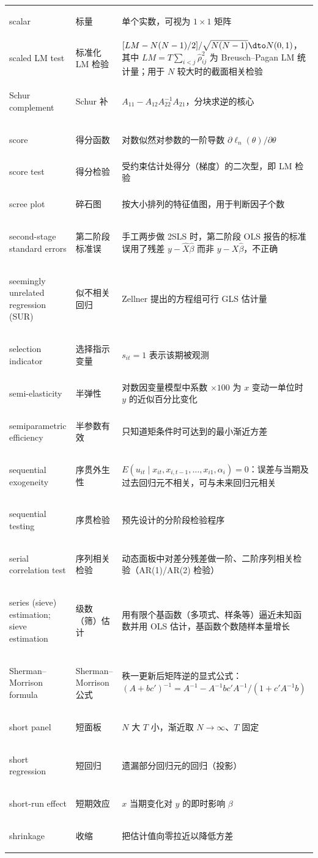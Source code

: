 \begin{longtable}{@{}>{\bfseries\boldmath\raggedright\arraybackslash}p{4.6cm}>{\raggedright\arraybackslash}p{3.2cm}>{\raggedright\arraybackslash}p{\dimexpr\textwidth-7.8cm-4\tabcolsep\relax}@{}}
scalar & 标量 & 单个实数，可视为 $1\times1$ 矩阵 \\
scaled LM test & 标准化 LM 检验 & $[LM-N(N-1)/2]/\sqrt{N(N-1)}\dto N(0,1)$，其中 $LM=T\sum_{i<j}\hat\rho_{ij}^2$ 为 Breusch--Pagan LM 统计量；用于 $N$ 较大时的截面相关检验 \\
Schur complement & Schur 补 & $A_{11}-A_{12}A_{22}^{-1}A_{21}$，分块求逆的核心 \\
score & 得分函数 & 对数似然对参数的一阶导数 $\partial\ell_n(\theta)/\partial\theta$ \\
score test & 得分检验 & 受约束估计处得分（梯度）的二次型，即 LM 检验 \\
scree plot & 碎石图 & 按大小排列的特征值图，用于判断因子个数 \\
second-stage standard errors & 第二阶段标准误 & 手工两步做 2SLS 时，第二阶段 OLS 报告的标准误用了残差 $y-\hat X\hat\beta$ 而非 $y-X\hat\beta$，不正确 \\
seemingly unrelated regression (SUR) & 似不相关回归 & Zellner 提出的方程组可行 GLS 估计量 \\
selection indicator & 选择指示变量 & $s_{it}=1$ 表示该期被观测 \\
semi-elasticity & 半弹性 & 对数因变量模型中系数 $\times100$ 为 $x$ 变动一单位时 $y$ 的近似百分比变化 \\
semiparametric efficiency & 半参数有效 & 只知道矩条件时可达到的最小渐近方差 \\
sequential exogeneity & 序贯外生性 & $E(u_{it}\mid x_{it},x_{i,t-1},\dots,x_{i1},\alpha_i)=0$：误差与当期及过去回归元不相关，可与未来回归元相关 \\
sequential testing & 序贯检验 & 预先设计的分阶段检验程序 \\
serial correlation test & 序列相关检验 & 动态面板中对差分残差做一阶、二阶序列相关检验（AR(1)/AR(2) 检验） \\
series (sieve) estimation; sieve estimation & 级数（筛）估计 & 用有限个基函数（多项式、样条等）逼近未知函数并用 OLS 估计，基函数个数随样本量增长 \\
Sherman--Morrison formula & Sherman--Morrison 公式 & 秩一更新后矩阵逆的显式公式：$(A+bc')^{-1}=A^{-1}-A^{-1}bc'A^{-1}/(1+c'A^{-1}b)$ \\
short panel & 短面板 & $N$ 大 $T$ 小，渐近取 $N\to\infty$、$T$ 固定 \\
short regression & 短回归 & 遗漏部分回归元的回归（投影） \\
short-run effect & 短期效应 & $x$ 当期变化对 $y$ 的即时影响 $\beta$ \\
shrinkage & 收缩 & 把估计值向零拉近以降低方差 \\

\end{longtable}
